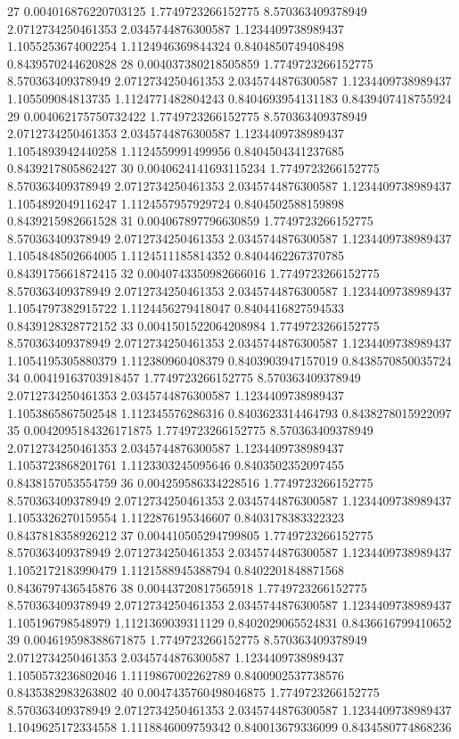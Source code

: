 {27 0.004016876220703125 1.7749723266152775 8.570363409378949 2.0712734250461353 2.0345744876300587 1.1234409738989437 1.1055253674002254 1.1124946369844324 0.8404850749408498 0.8439570244620828
28 0.004037380218505859 1.7749723266152775 8.570363409378949 2.0712734250461353 2.0345744876300587 1.1234409738989437 1.105509084813735 1.1124771482804243 0.8404693954131183 0.8439407418755924
29 0.004062175750732422 1.7749723266152775 8.570363409378949 2.0712734250461353 2.0345744876300587 1.1234409738989437 1.1054893942440258 1.1124559991499956 0.8404504341237685 0.8439217805862427
30 0.0040624141693115234 1.7749723266152775 8.570363409378949 2.0712734250461353 2.0345744876300587 1.1234409738989437 1.1054892049116247 1.1124557957929724 0.8404502588159898 0.8439215982661528
31 0.004067897796630859 1.7749723266152775 8.570363409378949 2.0712734250461353 2.0345744876300587 1.1234409738989437 1.1054848502664005 1.1124511185814352 0.8404462267370785 0.8439175661872415
32 0.0040743350982666016 1.7749723266152775 8.570363409378949 2.0712734250461353 2.0345744876300587 1.1234409738989437 1.1054797382915722 1.1124456279418047 0.8404416827594533 0.8439128328772152
33 0.0041501522064208984 1.7749723266152775 8.570363409378949 2.0712734250461353 2.0345744876300587 1.1234409738989437 1.1054195305880379 1.112380960408379 0.8403903947157019 0.8438570850035724
34 0.00419163703918457 1.7749723266152775 8.570363409378949 2.0712734250461353 2.0345744876300587 1.1234409738989437 1.1053865867502548 1.112345576286316 0.8403623314464793 0.8438278015922097
35 0.0042095184326171875 1.7749723266152775 8.570363409378949 2.0712734250461353 2.0345744876300587 1.1234409738989437 1.1053723868201761 1.1123303245095646 0.8403502352097455 0.8438157053554759
36 0.004259586334228516 1.7749723266152775 8.570363409378949 2.0712734250461353 2.0345744876300587 1.1234409738989437 1.1053326270159554 1.1122876195346607 0.8403178383322323 0.8437818358926212
37 0.004410505294799805 1.7749723266152775 8.570363409378949 2.0712734250461353 2.0345744876300587 1.1234409738989437 1.1052172183990479 1.1121588945388794 0.8402201848871568 0.8436797436545876
38 0.00443720817565918 1.7749723266152775 8.570363409378949 2.0712734250461353 2.0345744876300587 1.1234409738989437 1.105196798548979 1.1121369039311129 0.8402029065524831 0.8436616799410652
39 0.004619598388671875 1.7749723266152775 8.570363409378949 2.0712734250461353 2.0345744876300587 1.1234409738989437 1.1050573236802046 1.1119867002262789 0.8400902537738576 0.8435382983263802
40 0.0047435760498046875 1.7749723266152775 8.570363409378949 2.0712734250461353 2.0345744876300587 1.1234409738989437 1.1049625172334558 1.1118846009759342 0.840013679336099 0.8434580774868236
}
